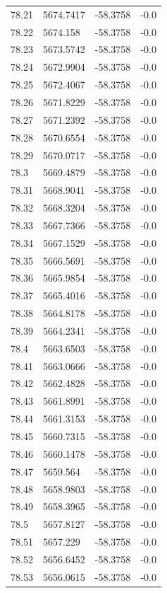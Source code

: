 \begin{table}[H]
\begin{tabular}{llll}
78.21 & 5674.7417 & -58.3758 & -0.0 \\
78.22 & 5674.158 & -58.3758 & -0.0 \\
78.23 & 5673.5742 & -58.3758 & -0.0 \\
78.24 & 5672.9904 & -58.3758 & -0.0 \\
78.25 & 5672.4067 & -58.3758 & -0.0 \\
78.26 & 5671.8229 & -58.3758 & -0.0 \\
78.27 & 5671.2392 & -58.3758 & -0.0 \\
78.28 & 5670.6554 & -58.3758 & -0.0 \\
78.29 & 5670.0717 & -58.3758 & -0.0 \\
78.3 & 5669.4879 & -58.3758 & -0.0 \\
78.31 & 5668.9041 & -58.3758 & -0.0 \\
78.32 & 5668.3204 & -58.3758 & -0.0 \\
78.33 & 5667.7366 & -58.3758 & -0.0 \\
78.34 & 5667.1529 & -58.3758 & -0.0 \\
78.35 & 5666.5691 & -58.3758 & -0.0 \\
78.36 & 5665.9854 & -58.3758 & -0.0 \\
78.37 & 5665.4016 & -58.3758 & -0.0 \\
78.38 & 5664.8178 & -58.3758 & -0.0 \\
78.39 & 5664.2341 & -58.3758 & -0.0 \\
78.4 & 5663.6503 & -58.3758 & -0.0 \\
78.41 & 5663.0666 & -58.3758 & -0.0 \\
78.42 & 5662.4828 & -58.3758 & -0.0 \\
78.43 & 5661.8991 & -58.3758 & -0.0 \\
78.44 & 5661.3153 & -58.3758 & -0.0 \\
78.45 & 5660.7315 & -58.3758 & -0.0 \\
78.46 & 5660.1478 & -58.3758 & -0.0 \\
78.47 & 5659.564 & -58.3758 & -0.0 \\
78.48 & 5658.9803 & -58.3758 & -0.0 \\
78.49 & 5658.3965 & -58.3758 & -0.0 \\
78.5 & 5657.8127 & -58.3758 & -0.0 \\
78.51 & 5657.229 & -58.3758 & -0.0 \\
78.52 & 5656.6452 & -58.3758 & -0.0 \\
78.53 & 5656.0615 & -58.3758 & -0.0 \\

\end{tabular}
\end{table}
